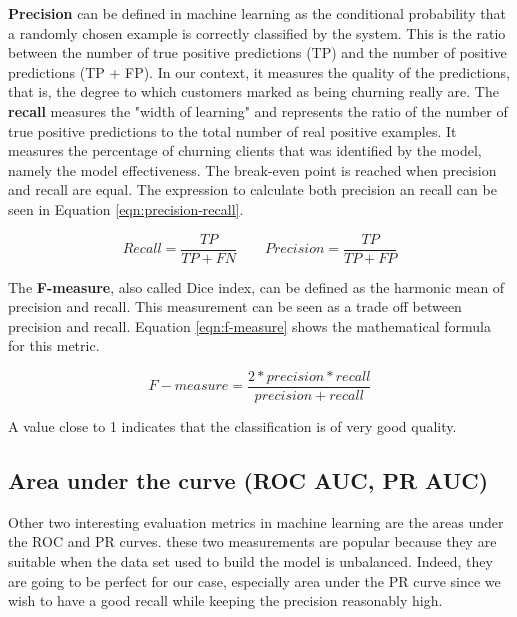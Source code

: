 \documentclass[LaM,binding=0.6cm, english]{sapthesis}
\begin{document}
\textbf{Precision} can be defined in machine learning as the conditional probability that a randomly chosen example is correctly classified by the system. This is the ratio between the number of true positive predictions (TP) and the number of positive predictions (TP + FP). In our context, it measures the quality of the predictions, that is, the degree to which customers marked as being churning really are. The \textbf{recall} measures the "width of learning" and represents the ratio of the number of true positive predictions to the total number of real positive examples. It measures the percentage of churning clients that was identified by the model, namely the model effectiveness. The break-even point is reached when precision and recall are equal.\cite{Namburu2005} The expression to calculate both precision an recall can be seen in Equation \ref{eqn:precision-recall}.

\begin{equation}
\label{eqn:precision-recall}
Recall = \frac{TP}{TP+FN} \qquad Precision = \frac{TP}{TP + FP}
\end{equation}

\par The \textbf{F-measure}, also called Dice index, can be defined as the harmonic mean of precision and recall. This measurement can be seen as a trade off between precision and recall. Equation \ref{eqn:f-measure} shows the mathematical formula for this metric.

\begin{equation}
\label{eqn:f-measure}
F-measure = \frac{2 * precision * recall}{precision + recall}
\end{equation}

A value close to 1 indicates that the classification is of very good quality.

\subsection{Area under the curve (ROC AUC, PR AUC)}

Other two interesting evaluation metrics in machine learning are the areas under the ROC and PR curves.\cite{Fogarty2005} these two measurements are popular because they are suitable when the data set used to build the model is unbalanced. Indeed, they are going to be perfect for our case, especially area under the PR curve since we wish to have a good recall while keeping the precision reasonably high.
\end{document}
